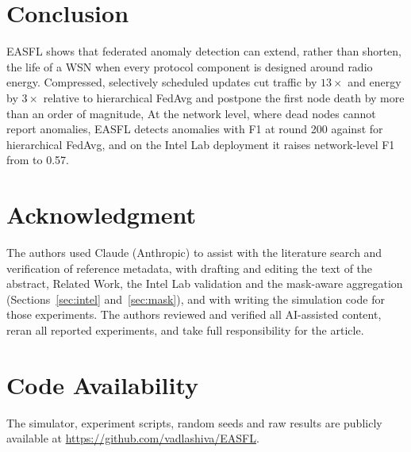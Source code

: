 \documentclass[journal]{IEEEtran}
\begin{document}
\section{Conclusion}
EASFL shows that federated anomaly detection can extend, rather than shorten, the life of a WSN when every protocol component is designed around radio energy. Compressed, selectively scheduled updates cut traffic by $13\times$ and energy by $3\times$ relative to hierarchical FedAvg and postpone the first node death by more than an order of magnitude,  At the network level, where dead nodes cannot report anomalies, EASFL detects anomalies with F1  at round 200 against  for hierarchical FedAvg, and on the Intel Lab deployment it raises network-level F1 from  to 0.57. 

\section*{Acknowledgment}
The authors used Claude (Anthropic) to assist with the literature search and verification of reference metadata, with drafting and editing the text of the abstract, Related Work, the Intel Lab validation and the mask-aware aggregation (Sections~\ref{sec:intel} and~\ref{sec:mask}), and with writing the simulation code for those experiments. The authors reviewed and verified all AI-assisted content, reran all reported experiments, and take full responsibility for the article.

\section*{Code Availability}
The simulator, experiment scripts, random seeds and raw results are publicly available at \url{https://github.com/vadlashiva/EASFL}.



\end{document}
